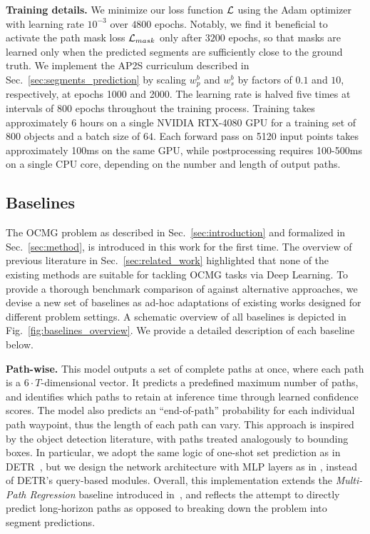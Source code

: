 \noindent \textbf{Training details.}
We minimize our loss function $\mathcal{L}$ using the Adam optimizer with learning rate $10^{-3}$ over $4800$ epochs.
Notably, we find it beneficial to activate the path mask loss $\mathcal{L}_{mask}$ only after $3200$ epochs, so that masks are learned only when the predicted segments are sufficiently close to the ground truth.
We implement the AP2S curriculum described in Sec.~\ref{sec:segments_prediction} by scaling $w^b_p$ and $w^b_s$ by factors of $0.1$ and $10$, respectively, at epochs 1000 and 2000.
The learning rate is halved five times at intervals of 800 epochs throughout the training process.
Training takes approximately $6$ hours on a single NVIDIA RTX-4080 GPU for a training set of $800$ objects and a batch size of $64$.
Each forward pass on 5120 input points takes approximately 100ms on the same GPU, while postprocessing requires 100-500ms on a single CPU core, depending on the number and length of output paths.

\subsection{Baselines}
The OCMG problem as described in Sec.~\ref{sec:introduction} and formalized in Sec.~\ref{sec:method}, is introduced in this work for the first time. The overview of previous literature in Sec.~\ref{sec:related_work} highlighted that none of the existing methods are suitable for tackling OCMG tasks via Deep Learning. To provide a thorough benchmark comparison of \ours against alternative approaches, we devise a new set of baselines as ad-hoc adaptations of existing works designed for different problem settings.
%
A schematic overview of all baselines is depicted in Fig.~\ref{fig:baselines_overview}.
We provide a detailed description of each baseline below.

\noindent\textbf{Path-wise.}
This model outputs a set of complete paths at once, where each path is a $6 {\cdot} T$-dimensional vector.
It predicts a predefined maximum number of paths, and identifies which paths to retain at inference time through learned confidence scores.
The model also predicts an ``end-of-path'' probability for each individual path waypoint, thus the length of each path can vary.
%
This approach is inspired by the object detection literature, with paths treated analogously to bounding boxes. In particular, we adopt the same logic of one-shot set prediction as in DETR~\cite{carion2020detr}, but we design the network architecture with MLP layers as in \ours, instead of DETR's query-based modules.
Overall, this implementation extends the \emph{Multi-Path Regression} baseline introduced in~\cite{tiboni2023paintnet}, and reflects the attempt to directly predict long-horizon paths as opposed to breaking down the problem into segment predictions.

